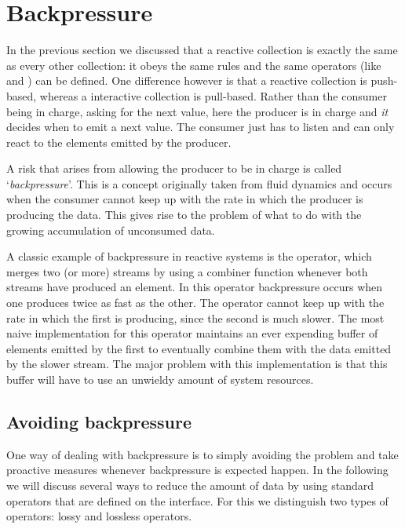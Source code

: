 
\section{Backpressure}
In the previous section we discussed that a reactive collection is exactly the same as every other collection: it obeys the same rules and the same operators (like  and ) can be defined. One difference however is that a reactive collection is push-based, whereas a interactive collection is pull-based. Rather than the consumer being in charge, asking for the next value, here the producer is in charge and \emph{it} decides when to emit a next value. The consumer just has to listen and can only react to the elements emitted by the producer.

A risk that arises from allowing the producer to be in charge is called `\textit{backpressure}'.  This is a concept originally taken from fluid dynamics and occurs when the consumer cannot keep up with the rate in which the producer is producing the data. This gives rise to the problem of what to do with the growing accumulation of unconsumed data.

A classic example of backpressure in reactive systems is the  operator, which merges two (or more) streams by using a combiner function whenever both streams have produced an element. In this operator backpressure occurs when one \obs produces twice as fast as the other. The operator cannot keep up with the rate in which the first \obs is producing, since the second \obs is much slower. The most naive implementation for this operator maintains an ever expending buffer of elements emitted by the first \obs to eventually combine them with the data emitted by the slower stream. The major problem with this implementation is that this buffer will have to use an unwieldy amount of system resources.

\subsection{Avoiding backpressure}
One way of dealing with backpressure is to simply avoiding the problem and take proactive measures whenever backpressure is expected happen. In the following we will discuss several ways to reduce the amount of data by using standard operators that are defined on the \obs interface. For this we distinguish two types of operators: lossy and lossless operators. 

